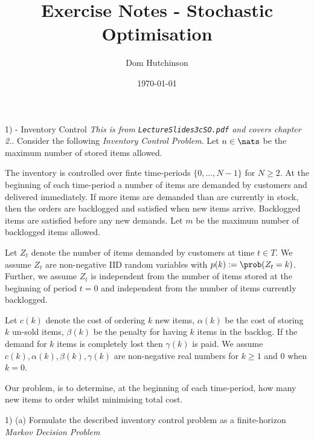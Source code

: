 \documentclass[11pt,a4paper]{article}
\begin{document}

\title{Exercise Notes - Stochastic Optimisation}
\author{Dom Hutchinson}
\date{\today}
\maketitle

\begin{question}{1) - Inventory Control}
  \textit{This is from \texttt{LectureSlides3cSO.pdf} and covers chapter 2.}.
  Consider the following \textit{Inventory Control Problem}. Let $n\in\nats$ be the maximum number of stored items allowed.
  \par The inventory is controlled over finte time-periods $\{0,\dots,N-1\}$ for $N\geq2$. At the beginning of each time-period a number of items are demanded by customers and delivered immediately. If more items are demanded than are currently in stock, then the orders are backlogged and satisfied when new items arrive. Backlogged items are satisfied before any new demands. Let $m$ be the maximum number of backlogged items allowed.
  \par Let $Z_t$ denote the number of items demanded by customers at time $t\in T$. We assume $Z_t$ are non-negative IID random variables with $p(k):=\prob(Z_t=k)$. Further, we assume $Z_t$ is independent from the number of items stored at the beginning of period $t=0$ and independent from the number of items currently backlogged.
  \par Let $c(k)$ denote the cost of ordering $k$ new items, $\alpha(k)$ be the cost of storing $k$ un-sold items, $\beta(k)$ be the penalty for having $k$ items in the backlog. If the demand for $k$ items is completely lost then $\gamma(k)$ is paid. We assume $c(k),\alpha(k),\beta(k),\gamma(k)$ are non-negative real numbers for $k\geq1$ and 0 when $k=0$.
  \par Our problem, is to determine, at the beginning of each time-period, how many new items to order whilst minimising total cost.
\end{question}

\begin{question}{1) (a)}
  Formulate the described inventory control problem as a finite-horizon \textit{Markov Decision Problem}
\end{question}
\end{document}
